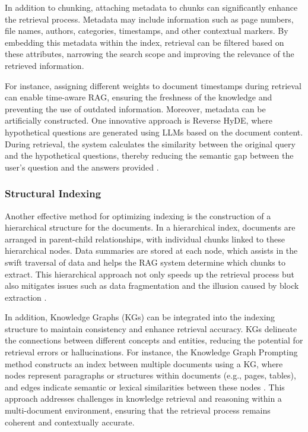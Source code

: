 In addition to chunking, attaching metadata to chunks can significantly enhance the retrieval process. Metadata may include information such as page numbers, file names, authors, categories, timestamps, and other contextual markers. By embedding this metadata within the index, retrieval can be filtered based on these attributes, narrowing the search scope and improving the relevance of the retrieved information. 

For instance, assigning different weights to document timestamps during retrieval can enable time-aware RAG, ensuring the freshness of the knowledge and preventing the use of outdated information. Moreover, metadata can be artificially constructed. One innovative approach is Reverse HyDE, where hypothetical questions are generated using LLMs based on the document content. During retrieval, the system calculates the similarity between the original query and the hypothetical questions, thereby reducing the semantic gap between the user's question and the answers provided \cite{gao2023retrieval}.

\subsubsection{Structural Indexing}

Another effective method for optimizing indexing is the construction of a hierarchical structure for the documents. In a hierarchical index, documents are arranged in parent-child relationships, with individual chunks linked to these hierarchical nodes. Data summaries are stored at each node, which assists in the swift traversal of data and helps the RAG system determine which chunks to extract. This hierarchical approach not only speeds up the retrieval process but also mitigates issues such as data fragmentation and the illusion caused by block extraction \cite{gao2023retrieval}.

In addition, Knowledge Graphs (KGs) can be integrated into the indexing structure to maintain consistency and enhance retrieval accuracy. KGs delineate the connections between different concepts and entities, reducing the potential for retrieval errors or hallucinations. For instance, the Knowledge Graph Prompting method constructs an index between multiple documents using a KG, where nodes represent paragraphs or structures within documents (e.g., pages, tables), and edges indicate semantic or lexical similarities between these nodes \cite{wang2024knowledge}. This approach addresses challenges in knowledge retrieval and reasoning within a multi-document environment, ensuring that the retrieval process remains coherent and contextually accurate.

